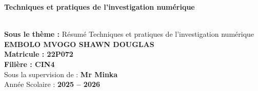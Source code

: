 \documentclass[12pt]{article}
\begin{document}
\vspace{2cm}

\begin{center} 
	\colorbox{orange!80}{
        \parbox{\dimexpr\textwidth-4\fboxsep}{
            \centering
            {\LARGE \textbf{Techniques et pratiques de l'investigation numérique}}
        }
    }\\[0.8cm]
    {\large \textbf{Sous le thème :} Résumé Techniques et pratiques de l'investigation numérique}\\[1.5cm]

    \textbf{{EMBOLO MVOGO SHAWN DOUGLAS}}\\[0.8cm]
    \textbf{{Matricule : 22P072}}\\[0.8cm]
    \textbf{{Filière : CIN4}}\\[0.8cm]
    Sous la supervision de : \textbf{Mr Minka}\\[1.5cm]

    Année Scolaire : \textbf{2025 -- 2026}
\end{center}


\newpage
\setcounter{page}{1}

\tableofcontents
\newpage
\end{document}
